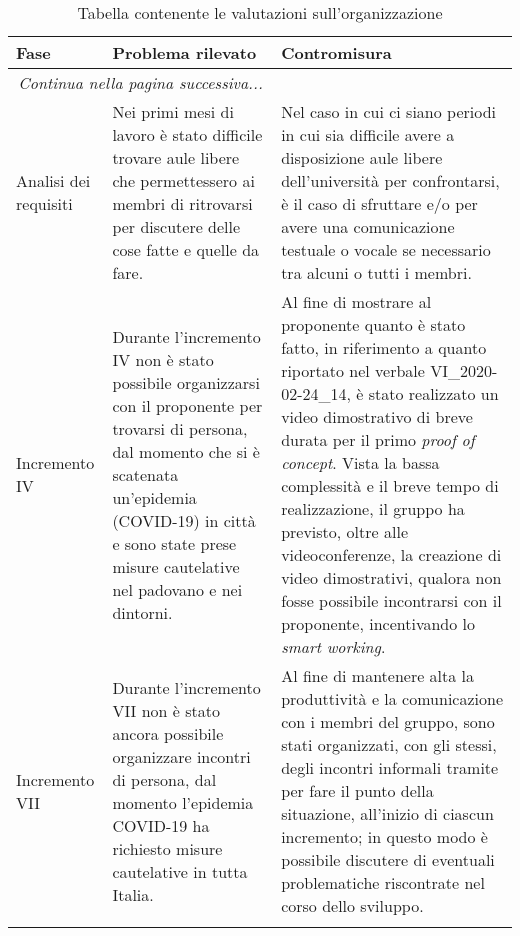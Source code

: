 		\begin{center}
			\begin{longtable}{|p{3cm}|p{6cm}|p{6cm}|}
				\hline
				\rowcolor{lighter-grayer}
				\textbf{Fase} & \textbf{Problema rilevato} & \textbf{Contromisura}\\
				\hline
				\endfirsthead
				\hline
		        \multicolumn{2}{|c|}{\textit{Continua nella pagina successiva...}}\\
		        \hline
		        \endfoot
		        \endlastfoot
		        
		        \hline
		        Analisi dei requisiti
		        &
		        Nei primi mesi di lavoro è stato difficile trovare aule libere che permettessero ai membri di ritrovarsi per discutere delle cose fatte e quelle da fare.
		        &
		        Nel caso in cui ci siano periodi in cui sia difficile avere a disposizione aule libere dell'università per confrontarsi, è il caso di sfruttare \glock{slack} e/o \glock{discord} per avere una comunicazione testuale o vocale se necessario tra alcuni o tutti i membri. \\
		        \hline
		        
				Incremento IV
				&
				Durante l'incremento IV non è stato possibile organizzarsi con il proponente per trovarsi di persona, dal momento che si è scatenata un'epidemia (COVID-19) in città e sono state prese misure cautelative nel padovano e nei dintorni.
			  	&
		 		Al fine di mostrare al proponente quanto è stato fatto, in riferimento a quanto riportato nel verbale VI\_2020-02-24\_14, è stato realizzato un video dimostrativo di breve durata per il primo \textit{proof of concept}. Vista la bassa complessità e il breve tempo di realizzazione, il gruppo ha previsto, oltre alle videoconferenze, la creazione di video dimostrativi, qualora non fosse possibile incontrarsi con il proponente, incentivando lo \textit{smart working}.  \\
				\hline

				Incremento VII
				&
				Durante l'incremento VII non è stato ancora possibile organizzare incontri di persona, dal momento l'epidemia COVID-19 ha richiesto misure cautelative in tutta Italia.
			  	&
		 		Al fine di mantenere alta la produttività e la comunicazione con i membri del gruppo, sono stati organizzati, con gli stessi, degli incontri informali tramite \glock{Discord} per fare il punto della situazione, all'inizio di ciascun incremento; in questo modo è possibile discutere di eventuali problematiche riscontrate nel corso dello sviluppo.  \\
				\hline
				
				\caption{Tabella contenente le valutazioni sull'organizzazione}
        
			\end{longtable}
		\end{center}

